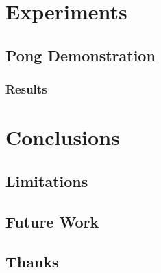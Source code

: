 \documentclass{report}
\begin{document}

\chapter{Experiments} 
\section{Pong Demonstration}
\subsection{Results}

\chapter{Conclusions}
\section{Limitations}
\section{Future Work}

\section{Thanks}



\end{document}
